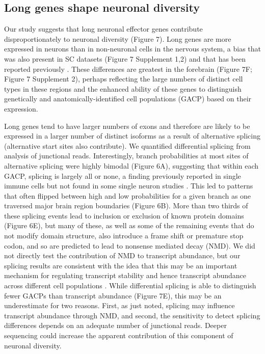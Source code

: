 \subsection{Long genes shape neuronal diversity}
Our study suggests that long neuronal effector genes contribute disproportionately to neuronal diversity (Figure 7). Long genes are more expressed in neurons than in non-neuronal cells in the nervous system, a bias that was also present in SC datasets (Figure 7 Supplement 1,2) and that has been reported previously \cite{Sugino_2014,Gabel_2015,Zylka_2015}. These differences are greatest in the forebrain (Figure 7F; Figure 7 Supplement 2), perhaps reflecting the large numbers of distinct cell types in these regions and the enhanced ability of these genes to distinguish genetically and anatomically-identified cell populations (GACP) based on their expression. 

Long genes tend to have larger numbers of exons and therefore are likely to be expressed in a larger number of distinct isoforms as a result of alternative splicing (alternative start sites also contribute). We quantified differential splicing from analysis of junctional reads. Interestingly, branch probabilities at most sites of alternative splicing were highly bimodal (Figure 6A), suggesting that within each GACP, splicing is largely all or none, a finding previously reported in single immune cells \cite{Shalek_2013} but not found in some single neuron studies \cite{Gokce_2016}. This led to patterns that often flipped between high and low probabilities for a given branch as one traversed major brain region boundaries (Figure 6B). More than two thirds of these splicing events lead to inclusion or exclusion of known protein domains (Figure 6E), but many of these, as well as some of the remaining events that do not modify domain structure, also introduce a frame shift or premature stop codon, and so are predicted to lead to nonsense mediated decay (NMD). We did not directly test the contribution of NMD to transcript abundance, but our splicing results are consistent with the idea that this may be an important mechanism for regulating transcript stability and hence transcript abundance across different cell populations \citep{Yan_2015,Traunmuller_2014}. While differential splicing is able to distinguish fewer GACPs than transcript abundance (Figure 7E), this may be an underestimate for two reasons. First, as just noted, splicing may influence transcript abundance through NMD, and second, the sensitivity to detect splicing differences depends on an adequate number of junctional reads. Deeper sequencing could increase the apparent contribution of this component of neuronal diversity.     

